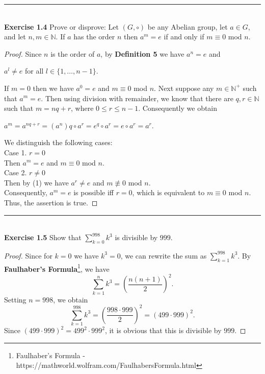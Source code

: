 \documentclass[a4paper]{article}
\begin{document}
\noindent\rule{12cm}{0.4pt}\\
\noindent \textbf{Exercise 1.4} Prove or disprove: Let $(G, \circ)$ be any Abelian group, let $a \in G$, and let $n, m \in \mathbb{N}$. If $a$ has the order $n$ then $a^m=e$ if and only if $m \equiv 0$ mod $n$.
\begin{proof}
Since $n$ is the order of $a$, by \textbf{Definition 5} we have $a^{n} = e$ and
\begin{center}
$a^{l} \neq e$ for all $l \in \{1, \ldots, n-1 \}$.
\end{center}
If $m=0$ then we have $a^{0}=e$ and $m\equiv 0$ mod $n$. Next suppose any $m \in \mathbb{N}^{+}$ such that $a^{m} = e$. Then using division with remainder, we know that there are $q,r \in \mathbb{N}$ such that $m = nq +r$, where $0 \leq r \leq n-1$. Consequently we obtain
\begin{center}
$a^{m} = a^{nq+r} = (a^{n})q \circ a^{r} = e^{q} \circ a^{r} = e \circ a^{r} = a^{r}$.
\end{center}
We distinguish the following cases:\\
Case 1. $r=0$\\
Then $a^{m} =e$ and $m \equiv 0$ mod $n$.\\
Case 2. $r \neq 0$\\
Then by (1) we have $a^{r} \neq e$ and $m \not\equiv 0$ mod $n$.\\
Consequently, $a^{m} = e$ is possible iff $r=0$, which is equivalent to $m \equiv 0$ mod $n$. Thus, the assertion is true.
\end{proof}



\noindent\rule{12cm}{0.4pt}\\
\noindent \textbf{Exercise 1.5} Show that $\sum_{k=0}^{998} k^3$ is divisible by $999$.
\begin{proof}
Since for $k=0$ we have $k^3 = 0$, we can rewrite the sum as $\sum_{k=1}^{998} k^3$. By \textbf{Faulhaber's Formula}\footnote{Faulhaber's Formula - https://mathworld.wolfram.com/FaulhabersFormula.html}, we have
$$\sum_{k=1}^{n} k^3 = \left(\frac{n(n+1)}{2}\right)^2.$$
Setting $n = 998$, we obtain
$$\sum_{k=1}^{998} k^3 = \left(\frac{998 \cdot 999}{2}\right)^2 = (499 \cdot 999)^2.$$
Since $(499 \cdot 999)^2 = 499^2 \cdot 999^2$, it is obvious that this is divisible by $999$.
\end{proof}
\end{document}
